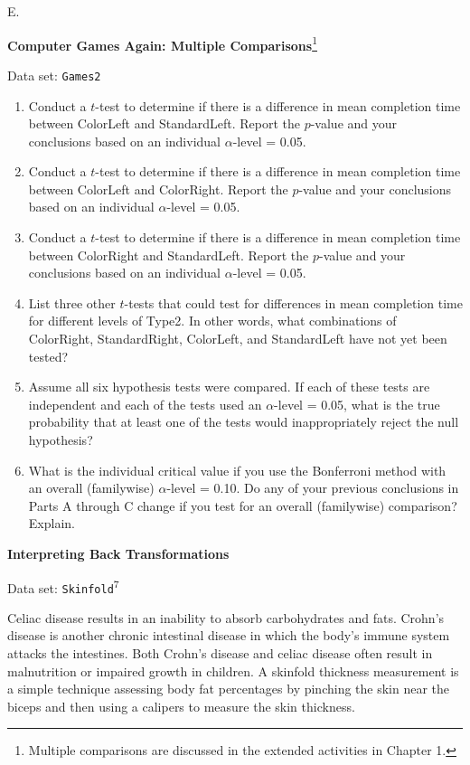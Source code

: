 \documentclass[
]{report}
\newcounter{excount}
\renewcommand{\theexcount}{E\arabic{excount}}
\begin{document}
\begin{list}{\theexcount.}{ \setlength{\itemsep}{1.2em}}
  \item \textbf{Computer Games Again: Multiple Comparisons}\footnote{Multiple comparisons are discussed in the extended activities in Chapter 1.}

Data set: \texttt{Games2}

    \begin{enumerate}
      \item Conduct a $t$-test to determine if there is a difference in mean completion time between ColorLeft and StandardLeft. Report the $p$-value and your conclusions based on an individual $\alpha$-level = 0.05.
      \item Conduct a $t$-test to determine if there is a difference in mean completion time between ColorLeft and ColorRight. Report the $p$-value and your conclusions based on an individual $\alpha$-level = 0.05.
      \item Conduct a $t$-test to determine if there is a difference in mean completion time between ColorRight and StandardLeft. Report the $p$-value and your conclusions based on an individual $\alpha$-level = 0.05.
      \item List three other $t$-tests that could test for differences in mean completion time for different levels of Type2. In other words, what combinations of ColorRight, StandardRight, ColorLeft, and StandardLeft have not yet been tested?
      \item Assume all six hypothesis tests were compared. If each of these tests are independent and each of the tests used an $\alpha$-level = 0.05, what is the true probability that at least one of the tests would inappropriately reject the null hypothesis?
      \item What is the individual critical value if you use the Bonferroni method with an overall (familywise) $\alpha$-level = 0.10. Do any of your previous conclusions in Parts A through C change if you test for an overall (familywise) comparison? Explain.
    \end{enumerate}

  \item \textbf{Interpreting Back Transformations}

Data set: \texttt{Skinfold}\textsuperscript{7}

Celiac disease results in an inability to absorb carbohydrates and fats. Crohn’s disease is another chronic intestinal disease in which the body’s immune system attacks the intestines. Both Crohn’s disease and celiac disease often result in malnutrition or impaired growth in children. A skinfold thickness measurement is a simple technique assessing body fat percentages by pinching the skin near the biceps and then using a calipers to measure the skin thickness.


\end{list}
\end{document}
